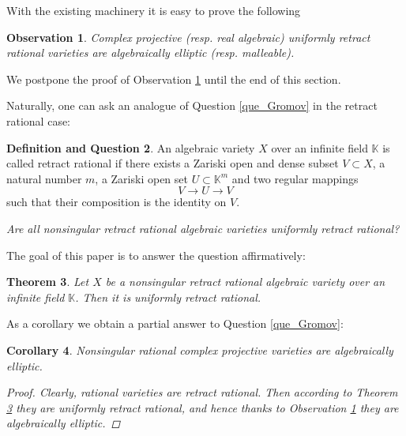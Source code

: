 \documentclass{amsart}
\theoremstyle{plain}
\newtheorem{thm}{Theorem}[section]
\newtheorem{obs}[thm]{Observation}
\newtheorem{cor}[thm]{Corollary}
\theoremstyle{definition}
\newtheorem{defiandque}[thm]{Definition and Question}
\theoremstyle{remark}
\numberwithin{equation}{section}
\newcommand{\K}{\mathbb{K}}
\begin{document}
With the existing machinery it is easy to prove the following
\begin{obs}\label{obs_urr=>Ge}
Complex projective (resp. real algebraic)  uniformly retract rational varieties are algebraically elliptic (resp. malleable).
\end{obs}

We postpone the proof of Observation \ref{obs_urr=>Ge} until the end of this section. 

Naturally, one can ask an analogue of Question \ref{que_Gromov} in the retract rational case:
\begin{defiandque}
An algebraic variety $X$ over an infinite field $\K$ is called retract rational if there exists a Zariski open and dense subset $V\subset X$, a natural number $m$, a Zariski open set $U\subset \K^m$ and two regular mappings
\begin{equation*}
    V\rightarrow U\rightarrow V 
\end{equation*}
such that their composition is the identity on $V$.

\emph{Are all nonsingular retract rational algebraic varieties uniformly retract rational?}
\end{defiandque}

The goal of this paper is to answer the question affirmatively:
\begin{thm}\label{main_thm}
Let $X$ be a nonsingular retract rational algebraic variety over an infinite field $\K$. Then it is uniformly retract rational.
\end{thm}

As a corollary we obtain a partial answer to Question \ref{que_Gromov}:
\begin{cor}
Nonsingular rational complex projective varieties are algebraically elliptic.
\begin{proof}
Clearly, rational varieties are retract rational. Then according to Theorem \ref{main_thm} they are uniformly retract rational, and hence thanks to Observation \ref{obs_urr=>Ge} they are algebraically elliptic.
\end{proof}
\end{cor}
\end{document}
